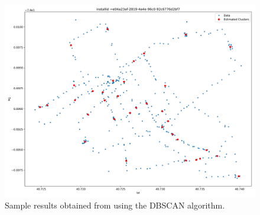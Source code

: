 \documentclass[12pt]{article}
\begin{document}
\begin{figure}[H]
\centering
\includegraphics[width=6.5in]{graphics/dbscan01.png}
\caption{Sample results obtained from using the DBSCAN algorithm.}
\label{fig:dbscan01}
\end{figure}
\end{document}
